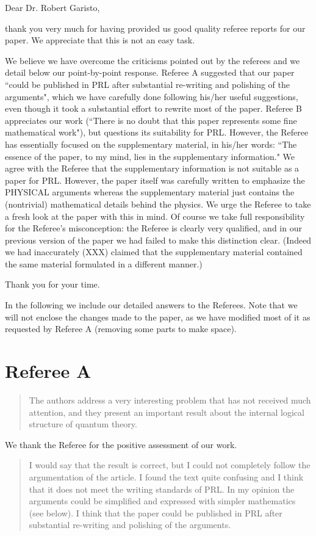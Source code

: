 \documentclass[11pt]{article}
\begin{document}
Dear Dr. Robert Garisto, 

thank you very much for having provided us
good quality referee reports for our paper. We appreciate that this is
not an easy task.

We believe we have overcome the criticisms pointed out by the referees
and we detail below our point-by-point response. Referee A suggested
that our paper ``could be published in PRL after substantial re-writing
and polishing of the arguments", which we have carefully done
following his/her useful suggestions, even though it took a
substantial effort to rewrite most of the paper. Referee B appreciates
our work (``There is no doubt that this paper represents some fine
mathematical work"), but questions its suitability for PRL. However,
the Referee has essentially focused on the supplementary material, in
his/her words: ``The essence of the paper, to my mind, lies in the
supplementary information." We agree with the Referee that the
supplementary information is not suitable as a paper for PRL. However,
the paper itself was carefully written to emphasize the PHYSICAL
arguments whereas the supplementary material just contains the
(nontrivial) mathematical details behind the physics. We urge the
Referee to take a fresh look at the paper with this in mind. Of course
we take full responsibility for the Referee's misconception: the
Referee is clearly very qualified, and in our previous version of the
paper we had failed to make this distinction clear. (Indeed we had
inaccurately (XXX) claimed that the supplementary material contained the same
material formulated in a different manner.)

Thank you for your time. 

In the following we include our detailed answers to the Referees. Note 
that we will not enclose the changes made to
the paper, as we have modified most of it as requested by Referee A (removing some parts to make
space).


\section*{Referee A}

\begin{quote}
The authors address a very interesting problem that has
not received much attention, and they present an important result
about the internal logical structure of quantum theory.
\end{quote}

We thank the Referee for the positive assessment of our work.
\begin{quote}
I would say that the result is correct, but I could not
completely follow the argumentation of the article. I found the text
quite confusing and I think that it does not meet the writing
standards of PRL. In my opinion the arguments could be simplified and
expressed with simpler mathematics (see below). I think that the paper
could be published in PRL after substantial re-writing and polishing
of the arguments.
\end{quote}
\end{document}

